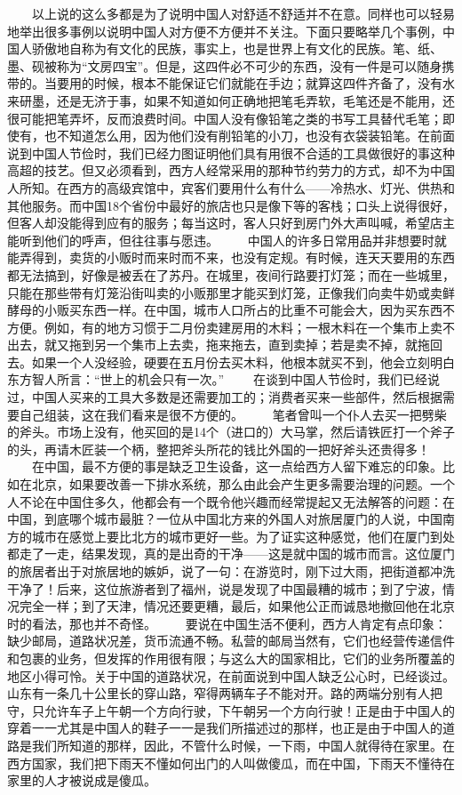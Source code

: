 \documentclass[12pt,oneside]{book}
\begin{document}
\begin{common-format}
　　以上说的这么多都是为了说明中国人对舒适不舒适并不在意。同样也可以轻易地举出很多事例以说明中国人对方便不方便并不关注。下面只要略举几个事例，中国人骄傲地自称为有文化的民族，事实上，也是世界上有文化的民族。笔、纸、墨、砚被称为“文房四宝”。但是，这四件必不可少的东西，没有一件是可以随身携带的。当要用的时候，根本不能保证它们就能在手边；就算这四件齐备了，没有水来研墨，还是无济于事，如果不知道如何正确地把笔毛弄软，毛笔还是不能用，还很可能把笔弄坏，反而浪费时间。中国人没有像铅笔之类的书写工具替代毛笔；即使有，也不知道怎么用，因为他们没有削铅笔的小刀，也没有衣袋装铅笔。在前面说到中国人节俭时，我们已经力图证明他们具有用很不合适的工具做很好的事这种高超的技艺。但又必须看到，西方人经常采用的那种节约劳力的方式，却不为中国人所知。在西方的高级宾馆中，宾客们要用什么有什么——冷热水、灯光、供热和其他服务。而中国18个省份中最好的旅店也只是像下等的客栈；口头上说得很好，但客人却没能得到应有的服务；每当这时，客人只好到房门外大声叫喊，希望店主能听到他们的呼声，但往往事与愿违。 
　　中国人的许多日常用品并非想要时就能弄得到，卖货的小贩时而来时而不来，也没有定规。有时候，连天天要用的东西都无法搞到，好像是被丢在了苏丹。在城里，夜间行路要打灯笼；而在一些城里，只能在那些带有灯笼沿街叫卖的小贩那里才能买到灯笼，正像我们向卖牛奶或卖鲜酵母的小贩买东西一样。在中国，城市人口所占的比重不可能会大，因为买东西不方便。例如，有的地方习惯于二月份卖建房用的木料；一根木料在一个集市上卖不出去，就又拖到另一个集市上去卖，拖来拖去，直到卖掉；若是卖不掉，就拖回去。如果一个人没经验，硬要在五月份去买木料，他根本就买不到，他会立刻明白东方智人所言：“世上的机会只有一次。” 
　　在谈到中国人节俭时，我们已经说过，中国人买来的工具大多数是还需要加工的；消费者买来一些部件，然后根据需要自己组装，这在我们看来是很不方便的。 
　　笔者曾叫一个仆人去买一把劈柴的斧头。市场上没有，他买回的是14个（进口的）大马掌，然后请铁匠打一个斧子的头，再请木匠装一个柄，整把斧头所花的钱比外国的一把好斧头还贵得多！ 
　　在中国，最不方便的事是缺乏卫生设备，这一点给西方人留下难忘的印象。比如在北京，如果要改善一下排水系统，那么由此会产生更多需要治理的问题。一个人不论在中国住多久，他都会有一个既令他兴趣而经常提起又无法解答的问题：在中国，到底哪个城市最脏？一位从中国北方来的外国人对旅居厦门的人说，中国南方的城市在感觉上要比北方的城市更好一些。为了证实这种感觉，他们在厦门到处都走了一走，结果发现，真的是出奇的干净——这是就中国的城市而言。这位厦门的旅居者出于对旅居地的嫉妒，说了一句：在游览时，刚下过大雨，把街道都冲洗干净了！后来，这位旅游者到了福州，说是发现了中国最糟的城市；到了宁波，情况完全一样；到了天津，情况还要更糟，最后，如果他公正而诚恳地撤回他在北京时的看法，那也并不奇怪。 
　　要说在中国生活不便利，西方人肯定有点印象：缺少邮局，道路状况差，货币流通不畅。私营的邮局当然有，它们也经营传递信件和包裹的业务，但发挥的作用很有限；与这么大的国家相比，它们的业务所覆盖的地区小得可怜。关于中国的道路状况，在前面说到中国人缺乏公心时，已经谈过。山东有一条几十公里长的穿山路，窄得两辆车子不能对开。路的两端分别有人把守，只允许车子上午朝一个方向行驶，下午朝另一个方向行驶！正是由于中国人的穿着一一尤其是中国人的鞋子一一是我们所描述过的那样，也正是由于中国人的道路是我们所知道的那样，因此，不管什么时候，一下雨，中国人就得待在家里。在西方国家，我们把下雨天不懂如何出门的人叫做傻瓜，而在中国，下雨天不懂待在家里的人才被说成是傻瓜。 

\end{common-format}
\end{document}
